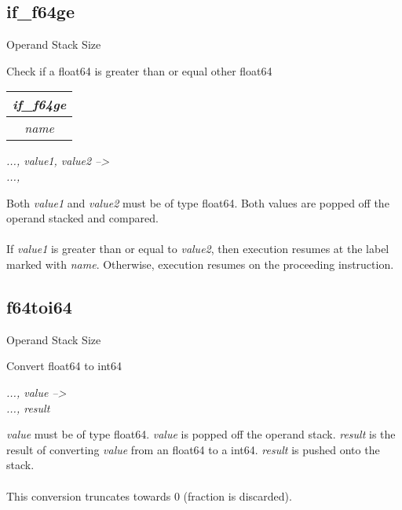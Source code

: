 \documentclass[12pt]{article}
\begin{document}
		\subsection*{if\_f64ge}
			\begin{labeling}{Operand Stack Size}
				\item [\textbf{Operation}] Check if a float64 is greater than or equal other float64
				\item [\textbf{Format}] \begin{tabular}{| c |} \hline \textit{if\_f64ge} \\ \hline \textit{name} \\ \hline \end{tabular}
				\item [\textbf{Operand Stack}] \textit{..., value1, value2 --\textgreater} \\
										\textit{..., }
				\item [\textbf{Description}] Both \textit{value1} and \textit{value2} must be of type float64. Both values are popped off the operand stacked and compared. \\ \\
				If \textit{value1} is greater than or equal to \textit{value2}, then execution resumes at the label marked with \textit{name}. Otherwise, execution resumes on the proceeding instruction. 
			\end{labeling}	
		\newpage
		\subsection*{f64toi64}
			\begin{labeling}{Operand Stack Size}
				\item [\textbf{Operation}] Convert float64 to int64
				\item [\textbf{Format}] 
				\item [\textbf{Operand Stack}] \textit{..., value --\textgreater} \\
										\textit{..., result}
				\item [\textbf{Description}] \textit{value} must be of type float64. \textit{value} is popped off the operand stack. \textit{result} is the result of converting \textit{value} from an float64 to a int64. \textit{result} is pushed onto the stack. \\ \\
				This conversion truncates towards 0 (fraction is discarded).  
			\end{labeling}	
		\newpage
	
\end{document}
